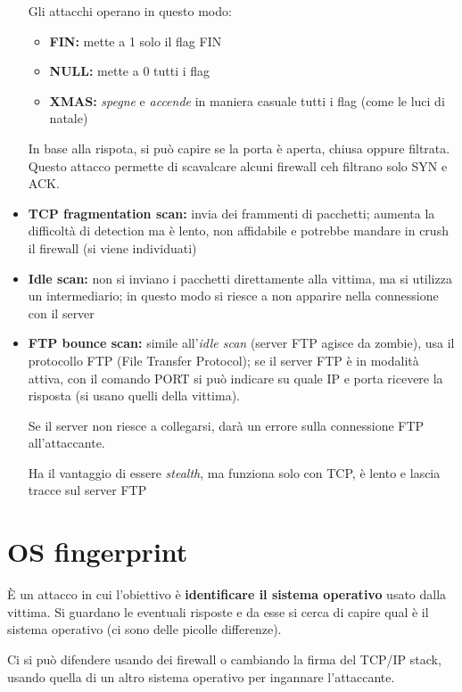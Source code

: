 \begin{itemize}
    \noindent Gli attacchi operano in questo modo:
    \begin{itemize}
        \item \textbf{FIN:} mette a 1 solo il flag FIN 
        \item \textbf{NULL:} mette a 0 tutti i flag 
        \item \textbf{XMAS:} \textit{spegne} e \textit{accende} in maniera casuale tutti i flag (come 
        le luci di natale)
    \end{itemize}

    \noindent In base alla rispota, si può capire se la porta è aperta, chiusa oppure filtrata. Questo attacco 
    permette di scavalcare alcuni firewall ceh filtrano solo SYN e ACK.
    \item \textbf{TCP fragmentation scan:} invia dei frammenti di pacchetti; aumenta la difficoltà di detection ma 
    è lento, non affidabile e potrebbe mandare in crush il firewall (si viene individuati)
    \item \textbf{Idle scan:} non si inviano i pacchetti direttamente alla vittima, ma si utilizza 
    un intermediario; in questo modo si riesce a non apparire nella connessione con il server
    \item \textbf{FTP bounce scan:} simile all'\textit{idle scan} (server FTP agisce da zombie), usa il protocollo FTP (File Transfer Protocol);
    se il server FTP è in modalità attiva, con il comando PORT si può indicare su quale IP e porta 
    ricevere la risposta (si usano quelli della vittima).

    \noindent Se il server non riesce a collegarsi, darà un errore sulla connessione FTP all'attaccante.

    \noindent Ha il vantaggio di essere \textit{stealth}, ma funziona solo con TCP, è lento e 
    lascia tracce sul server FTP
\end{itemize}

\section{OS fingerprint}
È un attacco in cui l'obiettivo è \textbf{identificare il sistema operativo} usato dalla vittima.
Si guardano le eventuali risposte e da esse si cerca di capire qual è il sistema operativo (ci 
sono delle picolle differenze).

\noindent Ci si può difendere usando dei firewall o cambiando la firma del TCP/IP stack, usando
quella di un altro sistema operativo per ingannare l'attaccante.



































